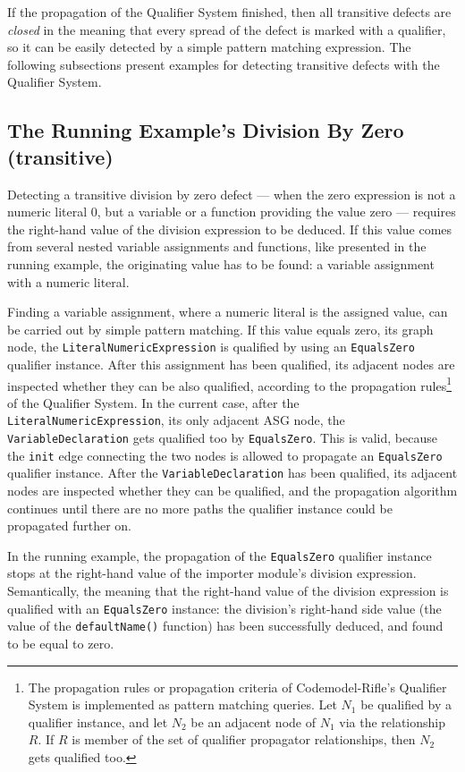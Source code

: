 If the propagation of the Qualifier System finished, then all transitive defects are \emph{closed} in the meaning that every spread of the defect is marked with a qualifier, so it can be easily detected by a simple pattern matching expression. The following subsections present examples for detecting transitive defects with the Qualifier System.


\subsection{The Running Example's Division By Zero (transitive)}

Detecting a transitive division by zero defect — when the zero expression is not a numeric literal 0, but a variable or a function providing the value zero — requires the right-hand value of the division expression to be deduced. If this value comes from several nested variable assignments and functions, like presented in the running example, the originating value has to be found: a variable assignment with a numeric literal.

Finding a variable assignment, where a numeric literal is the assigned value, can be carried out by simple pattern matching. If this value equals zero, its graph node, the \lstinline{LiteralNumericExpression} is qualified by using an \lstinline{EqualsZero} qualifier instance. After this assignment has been qualified, its adjacent nodes are inspected whether they can be also qualified, according to the propagation rules\footnote{The propagation rules or propagation criteria of Codemodel-Rifle's Qualifier System is implemented as pattern matching queries. Let $N_1$ be qualified by a qualifier instance, and let $N_2$ be an adjacent node of $N_1$ via the relationship $R$. If $R$ is member of the set of qualifier propagator relationships, then $N_2$ gets qualified too.} of the Qualifier System. In the current case, after the \lstinline{LiteralNumericExpression}, its only adjacent ASG node, the \lstinline{VariableDeclaration} gets qualified too by \lstinline{EqualsZero}. This is valid, because the \lstinline{init} edge connecting the two nodes is allowed to propagate an \lstinline{EqualsZero} qualifier instance. After the \lstinline{VariableDeclaration} has been qualified, its adjacent nodes are inspected whether they can be qualified, and the propagation algorithm continues until there are no more paths the qualifier instance could be propagated further on.

In the running example, the propagation of the \lstinline{EqualsZero} qualifier instance stops at the right-hand value of the importer module's division expression. Semantically, the meaning that the right-hand value of the division expression is qualified with an \lstinline{EqualsZero} instance: the division's right-hand side value (the value of the \lstinline{defaultName()} function) has been successfully deduced, and found to be equal to zero.

